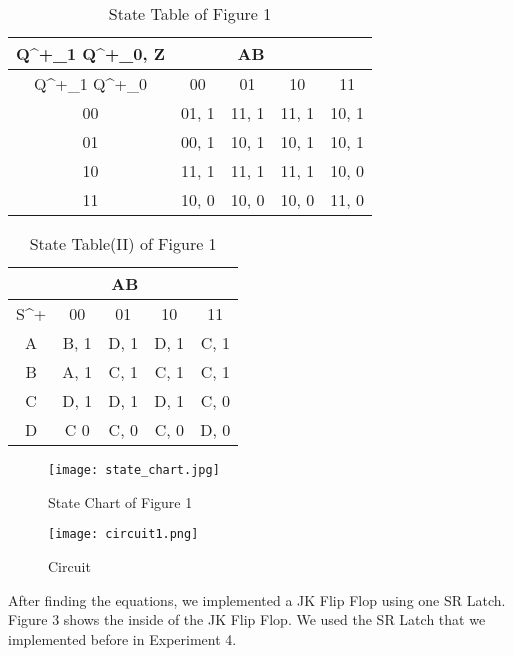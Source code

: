\documentclass[pdftex,12pt,a4paper]{article}
\begin{document}
\begin{table}[h!]
\centering
\begin{tabular}{|c|cccc|}
\hline
Q^{+}_{1} Q^{+}_{0}, Z &       & \multicolumn{1}{r}{AB} &       &       \\ \hline
Q^{+}_{1} Q^{+}_{0}    & 00    & 01                     & 10    & 11    \\ \hline
00       & 01, 1 & 11, 1                  & 11, 1 & 10, 1 \\
01       & 00, 1 & 10, 1                  & 10, 1 & 10, 1 \\
10       & 11, 1 & 11, 1                  & 11, 1 & 10, 0 \\
11       & 10, 0 & 10, 0                  & 10, 0 & 11, 0 \\ \hline
\end{tabular}
\caption{\label{tab:table-name}State Table of Figure 1}
\end{table}

\begin{table}[h!]
\centering
\begin{tabular}{|c|cccc|}
\hline
  &      & \multicolumn{1}{r}{AB} &      &      \\ \hline
S^{+} & 00   & 01                     & 10   & 11   \\ \hline
A & B, 1 & D, 1                   & D, 1 & C, 1 \\
B & A, 1 & C, 1                   & C, 1 & C, 1 \\
C & D, 1 & D, 1                   & D, 1 & C, 0 \\
D & C 0  & C, 0                   & C, 0 & D, 0 \\ \hline
\end{tabular}
\caption{\label{tab:table-name}State Table(II) of Figure 1}
\end{table}

\begin{figure}[hbt!]
	\centering
	\texttt{[image: state\_chart.jpg]}	
	\caption{State Chart of Figure 1}
	\label{fig1}
\end{figure}

\begin{figure}[]
	\centering
	\texttt{[image: circuit1.png]}	
	\caption{Circuit}
	\label{fig1}
\end{figure}
\clearpage

After finding the equations, we implemented a JK Flip Flop using one SR Latch. Figure 3 shows the inside of the JK Flip Flop. We used the SR Latch that we implemented before in Experiment 4.
\end{document}
